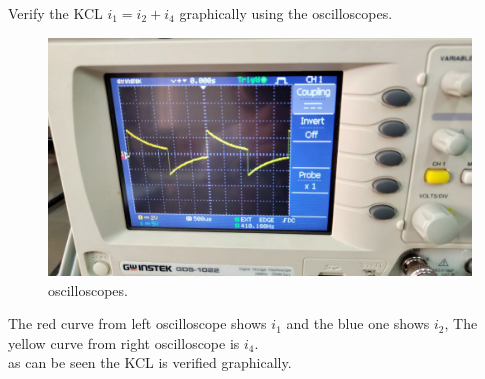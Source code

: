 \documentclass[11pt]{article}
\begin{document}
\begin{question}
\begin{subquestion}{Verify the KCL $i_1=i_2+i_4$ graphically using the oscilloscopes.}
{\begin{figure}[H]
                \includegraphics[scale=0.1,angle=0]{Fig/17.jpeg}
                \caption{oscilloscopes.}
            \end{figure}

            The red curve from left oscilloscope shows $i_1$ and the blue one shows $i_2$, The yellow curve from right oscilloscope is $i_4$. \\
            as can be seen the KCL is verified graphically.
        }
    \end{subquestion}


\end{question}
\end{document}
